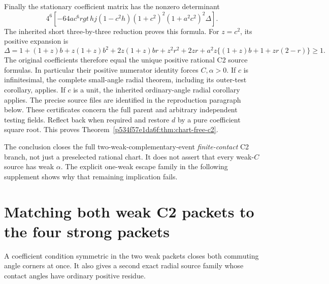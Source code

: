 Finally the stationary coefficient matrix has the nonzero determinant
\[
4^6[-64ac^6rgt\,hj(1-c^2h)(1+c^2)^2(1+a^2c^2)^2\Delta].
\]
The inherited short three-by-three reduction proves this formula.
For \(z=c^2\), its positive expansion is
\[
\Delta=1+(1+z)b+z(1+z)b^2+2z(1+z)br+z^2r^2+2zr
       +a^2z\{(1+z)b+1+zr(2-r)\}\ge1.
\]
The original coefficients
therefore equal the unique positive rational C2 source formulas.
In particular their positive numerator identity forces \(C,\alpha>0\).
If \(c\) is infinitesimal, the complete small-angle radial theorem,
including its outer-test corollary, applies. If \(c\) is a unit,
the inherited ordinary-angle radial corollary applies. The precise
source files are identified in the reproduction paragraph below. These certificates concern
the full parent and arbitrary independent testing fields. Reflect back
when required and restore \(d\) by a pure coefficient square root.
This proves Theorem~\ref{p534f57e1da6f:thm:chart-free-c2}.

The conclusion closes the full two-weak-complementary-event
\emph{finite-contact} C2 branch, not just a preselected rational chart.
It does not assert that every weak-\(C\) source has weak \(\alpha\).
The explicit one-weak escape family in the following supplement shows
why that remaining implication fails.


\section{\texorpdfstring{Matching both weak C2 packets to the four strong packets}{Matching both weak C2 packets to the four strong packets}}
\label{component:p8b53b68d8af6}

\label{p8b53b68d8af6:sec:c2-matching-strength}

A coefficient condition symmetric in the two weak packets closes both
commuting angle corners at once.  It also gives a second exact radial
source family whose contact angles have ordinary positive residue.

